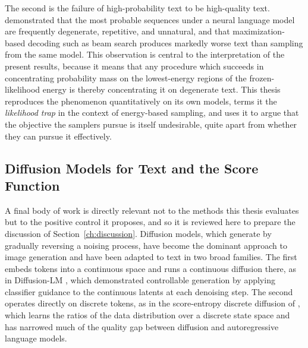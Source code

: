 The second is the failure of high-probability text to be high-quality text. \citet{holtzman2020curious} demonstrated that the most probable sequences under a neural language model are frequently degenerate, repetitive, and unnatural, and that maximization-based decoding such as beam search produces markedly worse text than sampling from the same model. This observation is central to the interpretation of the present results, because it means that any procedure which succeeds in concentrating probability mass on the lowest-energy regions of the frozen-likelihood energy is thereby concentrating it on degenerate text. This thesis reproduces the phenomenon quantitatively on its own models, terms it the \emph{likelihood trap} in the context of energy-based sampling, and uses it to argue that the objective the samplers pursue is itself undesirable, quite apart from whether they can pursue it effectively.

\subsection{Diffusion Models for Text and the Score Function}
\label{sec:rel-diffusion}

A final body of work is directly relevant not to the methods this thesis evaluates but to the positive control it proposes, and so it is reviewed here to prepare the discussion of Section~\ref{ch:discussion}. Diffusion models, which generate by gradually reversing a noising process, have become the dominant approach to image generation and have been adapted to text in two broad families. The first embeds tokens into a continuous space and runs a continuous diffusion there, as in Diffusion-LM \citep{li2022diffusion}, which demonstrated controllable generation by applying classifier guidance to the continuous latents at each denoising step. The second operates directly on discrete tokens, as in the score-entropy discrete diffusion of \citet{lou2024discrete}, which learns the ratios of the data distribution over a discrete state space and has narrowed much of the quality gap between diffusion and autoregressive language models.

